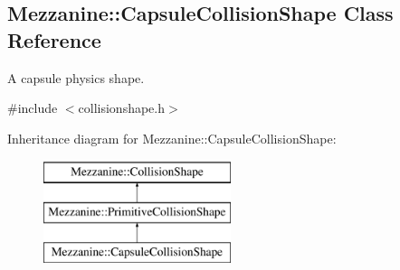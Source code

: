 \hypertarget{classMezzanine_1_1CapsuleCollisionShape}{
\subsection{Mezzanine::CapsuleCollisionShape Class Reference}
\label{classMezzanine_1_1CapsuleCollisionShape}
}


A capsule physics shape.  




{\ttfamily \#include $<$collisionshape.h$>$}

Inheritance diagram for Mezzanine::CapsuleCollisionShape:\begin{figure}[H]
\begin{center}
\leavevmode
\includegraphics[height=3.000000cm]{classMezzanine_1_1CapsuleCollisionShape}
\end{center}
\end{figure}

